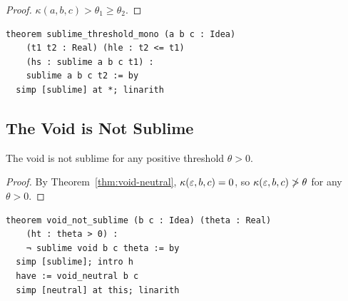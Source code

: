 \begin{proof}
$\kappa(a, b, c) > \theta_1 \geq \theta_2$.
\end{proof}

\begin{lstlisting}
theorem sublime_threshold_mono (a b c : Idea)
    (t1 t2 : Real) (hle : t2 <= t1)
    (hs : sublime a b c t1) :
    sublime a b c t2 := by
  simp [sublime] at *; linarith
\end{lstlisting}

\subsection{The Void is Not Sublime}

\begin{theorem}
\label{thm:void-not-sublime}
The void is not sublime for any positive threshold $\theta > 0$.
\end{theorem}

\begin{proof}
By Theorem~\ref{thm:void-neutral}, $\kappa(\varepsilon, b, c) = 0$, so
$\kappa(\varepsilon, b, c) \not> \theta$ for any $\theta > 0$.
\end{proof}

\begin{lstlisting}
theorem void_not_sublime (b c : Idea) (theta : Real)
    (ht : theta > 0) :
    ¬ sublime void b c theta := by
  simp [sublime]; intro h
  have := void_neutral b c
  simp [neutral] at this; linarith
\end{lstlisting}

